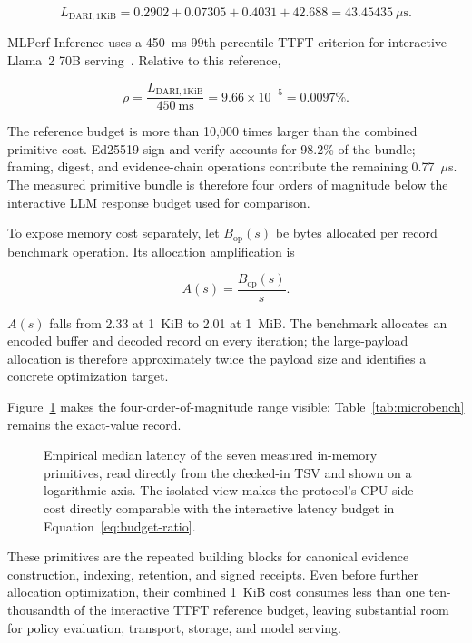\documentclass[10pt]{article}
\begin{document}
\begin{equation}
L_{\mathrm{DARI},1\mathrm{KiB}}
= 0.2902 + 0.07305 + 0.4031 + 42.688
= 43.45435~\mu\mathrm{s}.
\label{eq:interactive-budget}
\end{equation}

MLPerf Inference uses a 450~ms 99th-percentile TTFT criterion for interactive Llama~2 70B serving~\cite{mlperf2025llm}. Relative to this reference,

\begin{equation}
\rho = \frac{L_{\mathrm{DARI},1\mathrm{KiB}}}{450~\mathrm{ms}}
= 9.66 \times 10^{-5} = 0.0097\%.
\label{eq:budget-ratio}
\end{equation}

The reference budget is more than 10,000 times larger than the combined primitive cost. Ed25519 sign-and-verify accounts for 98.2\% of the bundle; framing, digest, and evidence-chain operations contribute the remaining 0.77~$\mu$s. The measured primitive bundle is therefore four orders of magnitude below the interactive LLM response budget used for comparison.

To expose memory cost separately, let $B_{\mathrm{op}}(s)$ be bytes allocated per record benchmark operation. Its allocation amplification is

\begin{equation}
A(s) = \frac{B_{\mathrm{op}}(s)}{s}.
\label{eq:allocation}
\end{equation}

$A(s)$ falls from 2.33 at 1~KiB to 2.01 at 1~MiB. The benchmark allocates an encoded buffer and decoded record on every iteration; the large-payload allocation is therefore approximately twice the payload size and identifies a concrete optimization target.

Figure~\ref{fig:primitive-latency} makes the four-order-of-magnitude range visible; Table~\ref{tab:microbench} remains the exact-value record.

\begin{figure}[H]
  \centering
  
  \caption{Empirical median latency of the seven measured in-memory primitives, read directly from the checked-in TSV and shown on a logarithmic axis. The isolated view makes the protocol's CPU-side cost directly comparable with the interactive latency budget in Equation~\ref{eq:budget-ratio}.}
  \label{fig:primitive-latency}
\end{figure}

These primitives are the repeated building blocks for canonical evidence construction, indexing, retention, and signed receipts. Even before further allocation optimization, their combined 1~KiB cost consumes less than one ten-thousandth of the interactive TTFT reference budget, leaving substantial room for policy evaluation, transport, storage, and model serving.
\end{document}
